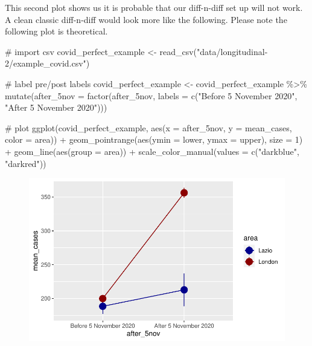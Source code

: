 \documentclass[
  letterpaper,
  DIV=11,
  numbers=noendperiod]{scrreprt}
\newenvironment{Shaded}{\begin{snugshade}}{\end{snugshade}}
\newcommand{\AttributeTok}[1]{\textcolor[rgb]{0.40,0.45,0.13}{#1}}
\newcommand{\CommentTok}[1]{\textcolor[rgb]{0.37,0.37,0.37}{#1}}
\newcommand{\DecValTok}[1]{\textcolor[rgb]{0.68,0.00,0.00}{#1}}
\newcommand{\FunctionTok}[1]{\textcolor[rgb]{0.28,0.35,0.67}{#1}}
\newcommand{\NormalTok}[1]{\textcolor[rgb]{0.00,0.23,0.31}{#1}}
\newcommand{\OtherTok}[1]{\textcolor[rgb]{0.00,0.23,0.31}{#1}}
\newcommand{\SpecialCharTok}[1]{\textcolor[rgb]{0.37,0.37,0.37}{#1}}
\newcommand{\StringTok}[1]{\textcolor[rgb]{0.13,0.47,0.30}{#1}}
\begin{document}
This second plot shows us it is probable that our diff-n-diff set up
will not work. A clean classic diff-n-diff would look more like the
following. Please note the following plot is theoretical.

\begin{Shaded}
\begin{Highlighting}[]
\CommentTok{\# import csv }
\NormalTok{covid\_perfect\_example }\OtherTok{\textless{}{-}} \FunctionTok{read\_csv}\NormalTok{(}\StringTok{"data/longitudinal{-}2/example\_covid.csv"}\NormalTok{)}

\CommentTok{\# label pre/post labels}
\NormalTok{covid\_perfect\_example }\OtherTok{\textless{}{-}}\NormalTok{ covid\_perfect\_example }\SpecialCharTok{\%\textgreater{}\%}
  \FunctionTok{mutate}\NormalTok{(}\AttributeTok{after\_5nov =} \FunctionTok{factor}\NormalTok{(after\_5nov, }\AttributeTok{labels =} \FunctionTok{c}\NormalTok{(}\StringTok{"Before 5 November 2020"}\NormalTok{, }\StringTok{"After 5 November 2020"}\NormalTok{)))}

\CommentTok{\# plot    }
\FunctionTok{ggplot}\NormalTok{(covid\_perfect\_example, }\FunctionTok{aes}\NormalTok{(}\AttributeTok{x =}\NormalTok{ after\_5nov, }\AttributeTok{y =}\NormalTok{ mean\_cases, }\AttributeTok{color =}\NormalTok{ area)) }\SpecialCharTok{+}
  \FunctionTok{geom\_pointrange}\NormalTok{(}\FunctionTok{aes}\NormalTok{(}\AttributeTok{ymin =}\NormalTok{ lower, }\AttributeTok{ymax =}\NormalTok{ upper), }\AttributeTok{size =} \DecValTok{1}\NormalTok{) }\SpecialCharTok{+} 
  \FunctionTok{geom\_line}\NormalTok{(}\FunctionTok{aes}\NormalTok{(}\AttributeTok{group =}\NormalTok{ area)) }\SpecialCharTok{+}
  \FunctionTok{scale\_color\_manual}\NormalTok{(}\AttributeTok{values =} \FunctionTok{c}\NormalTok{(}\StringTok{"darkblue"}\NormalTok{, }\StringTok{"darkred"}\NormalTok{))}
\end{Highlighting}
\end{Shaded}

\begin{figure}[H]

{\centering \includegraphics{longitudinal-2_files/figure-pdf/unnamed-chunk-15-1.pdf}

}

\end{figure}
\end{document}
